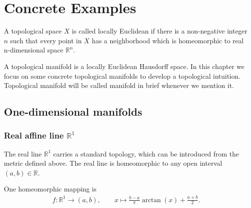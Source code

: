 \documentclass{report}
\begin{document}




\chapter{Concrete Examples}
A topological space $X$ is called locally Euclidean if there is a non-negative integer $n$ such that every point in $X$ has a neighborhood which is homeomorphic to real n-dimensional space $\mathbb{R}^n$.

\indent A topological manifold is a locally Euclidean Hausdorff space. In this chapter we focus on some concrete topological manifolds to develop a topological intuition. Topological manifold will be called manifold in brief whenever we mention it.

\section{One-dimensional manifolds}
\subsection{Real affine line $\mathbb{R}^1$}
The real line $\mathbb{R}^1$ carries a standard topology, which can be introduced from the metric defined above. The real line is homeomorphic to any open interval $(a, b)\in\mathbb{R}$.
\begin{center}
\end{center}
One homeomorphic mapping is
\begin{align*}
	f:\mathbb{R}^1\longrightarrow(a, b),\qquad
	x\longmapsto \frac{b-a}{\pi}\arctan\left(x\right)+\frac{a+b}{2}.
\end{align*}
\end{document}
